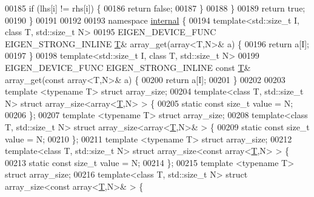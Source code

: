 \begin{DoxyCode}
00185     \textcolor{keywordflow}{if} (lhs[i] != rhs[i]) \{
00186       \textcolor{keywordflow}{return} \textcolor{keyword}{false};
00187     \}
00188   \}
00189   \textcolor{keywordflow}{return} \textcolor{keyword}{true};
00190 \}
00191 
00192 
00193 \textcolor{keyword}{namespace }\hyperlink{namespaceinternal}{internal} \{
00194 \textcolor{keyword}{template}<std::\textcolor{keywordtype}{size\_t} I, \textcolor{keyword}{class} T, std::\textcolor{keywordtype}{size\_t} N>
00195 EIGEN\_DEVICE\_FUNC EIGEN\_STRONG\_INLINE \hyperlink{group___sparse_core___module_class_eigen_1_1_triplet}{T}& array\_get(array<T,N>& a) \{
00196   \textcolor{keywordflow}{return} a[I];
00197 \}
00198 \textcolor{keyword}{template}<std::\textcolor{keywordtype}{size\_t} I, \textcolor{keyword}{class} T, std::\textcolor{keywordtype}{size\_t} N>
00199 EIGEN\_DEVICE\_FUNC EIGEN\_STRONG\_INLINE \textcolor{keyword}{const} \hyperlink{group___sparse_core___module_class_eigen_1_1_triplet}{T}& array\_get(\textcolor{keyword}{const} array<T,N>& a) \{
00200   \textcolor{keywordflow}{return} a[I];
00201 \}
00202 
00203 \textcolor{keyword}{template} <\textcolor{keyword}{typename} T> \textcolor{keyword}{struct }array\_size;
00204 \textcolor{keyword}{template}<\textcolor{keyword}{class} T, std::\textcolor{keywordtype}{size\_t} N> \textcolor{keyword}{struct }array\_size<array<\hyperlink{group___sparse_core___module_class_eigen_1_1_triplet}{T},N> > \{
00205   \textcolor{keyword}{static} \textcolor{keyword}{const} \textcolor{keywordtype}{size\_t} value = N;
00206 \};
00207 \textcolor{keyword}{template} <\textcolor{keyword}{typename} T> \textcolor{keyword}{struct }array\_size;
00208 \textcolor{keyword}{template}<\textcolor{keyword}{class} T, std::\textcolor{keywordtype}{size\_t} N> \textcolor{keyword}{struct }array\_size<array<\hyperlink{group___sparse_core___module_class_eigen_1_1_triplet}{T},N>& > \{
00209   \textcolor{keyword}{static} \textcolor{keyword}{const} \textcolor{keywordtype}{size\_t} value = N;
00210 \};
00211 \textcolor{keyword}{template} <\textcolor{keyword}{typename} T> \textcolor{keyword}{struct }array\_size;
00212 \textcolor{keyword}{template}<\textcolor{keyword}{class} T, std::\textcolor{keywordtype}{size\_t} N> \textcolor{keyword}{struct }array\_size<const array<\hyperlink{group___sparse_core___module_class_eigen_1_1_triplet}{T},N> > \{
00213   \textcolor{keyword}{static} \textcolor{keyword}{const} \textcolor{keywordtype}{size\_t} value = N;
00214 \};
00215 \textcolor{keyword}{template} <\textcolor{keyword}{typename} T> \textcolor{keyword}{struct }array\_size;
00216 \textcolor{keyword}{template}<\textcolor{keyword}{class} T, std::\textcolor{keywordtype}{size\_t} N> \textcolor{keyword}{struct }array\_size<const array<\hyperlink{group___sparse_core___module_class_eigen_1_1_triplet}{T},N>& > \{

\end{DoxyCode}

